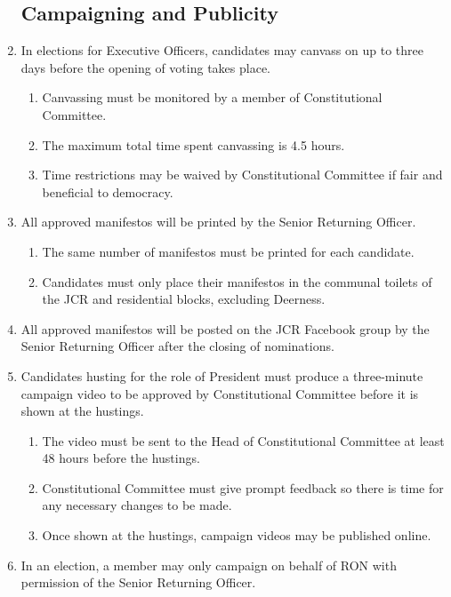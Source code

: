 \documentclass[12pt]{article}
\begin{document}
\begin{enumerate}
    \subsection{Campaigning and Publicity}
    \item In elections for Executive Officers, candidates may canvass on up to three days before the opening of voting takes place.
    \begin{enumerate}
        \item Canvassing must be monitored by a member of Constitutional Committee.
        \item The maximum total time spent canvassing is 4.5 hours.
        \item Time restrictions may be waived by Constitutional Committee if fair and beneficial to democracy.
    \end{enumerate}
    \item All approved manifestos will be printed by the Senior Returning Officer.
    \begin{enumerate}
        \item The same number of manifestos must be printed for each candidate.
        \item Candidates must only place their manifestos in the communal toilets of the JCR and residential blocks, excluding Deerness.
    \end{enumerate}
    \item All approved manifestos will be posted on the JCR Facebook group by the Senior Returning Officer after the closing of nominations.
    \item Candidates husting for the role of President must produce a three-minute campaign video to be approved by Constitutional Committee before it is shown at the hustings.
    \begin{enumerate}
        \item The video must be sent to the Head of Constitutional Committee at least 48 hours before the hustings.
        \item Constitutional Committee must give prompt feedback so there is time for any necessary changes to be made.
        \item Once shown at the hustings, campaign videos may be published online.
    \end{enumerate}
    \item In an election, a member may only campaign on behalf of RON with permission of the Senior Returning Officer.
    \begin{enumerate}

\end{enumerate}
\end{enumerate}
\end{document}
